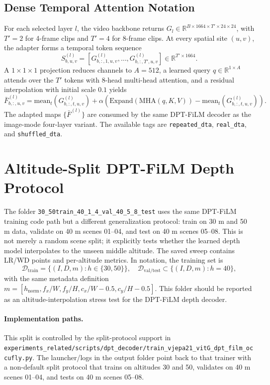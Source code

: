 \documentclass[10pt]{article}
\newcommand{\R}{\mathbb{R}}
\newcommand{\codepath}[1]{\begingroup\small\nolinkurl{#1}\endgroup}
\begin{document}
\subsection{Dense Temporal Attention Notation}
For each selected layer \(l\), the video backbone returns \(G_l\in\R^{B\times1664\times T'\times24\times24}\), with \(T'=2\) for 4-frame clips and \(T'=4\) for 8-frame clips.  At every spatial site \((u,v)\), the adapter forms a temporal token sequence
\[
S_{b,u,v}^{(l)} = [G_{b,:,1,u,v}^{(l)},\ldots,G_{b,:,T',u,v}^{(l)}]\in\R^{T'\times1664}.
\]
A \(1\times1\times1\) projection reduces channels to \(A=512\), a learned query \(q\in\R^{1\times A}\) attends over the \(T'\) tokens with 8-head multi-head attention, and a residual interpolation with initial scale \(0.1\) yields
\[
\bar{F}_{b,:,u,v}^{(l)}
= \mathrm{mean}_t(G_{b,:,t,u,v}^{(l)})+
\alpha\left(\mathrm{Expand}(\mathrm{MHA}(q,K,V))-\mathrm{mean}_t(G_{b,:,t,u,v}^{(l)})\right).
\]
The adapted maps \(\{\bar{F}^{(l)}\}\) are consumed by the same DPT-FiLM decoder as the image-mode four-layer variant.  The available tags are \codepath{repeated_dta}, \codepath{real_dta}, and \codepath{shuffled_dta}.

\section{Altitude-Split DPT-FiLM Depth Protocol}
The folder \codepath{30_50train_40_1_4_val_40_5_8_test} uses the same DPT-FiLM training code path but a different generalization protocol: train on 30 m and 50 m data, validate on 40 m scenes 01--04, and test on 40 m scenes 05--08.  This is not merely a random scene split; it explicitly tests whether the learned depth model interpolates to the unseen middle altitude.  The saved sweep contains LR/WD points and per-altitude metrics.  In notation, the training set is
\[
\mathcal{D}_{\mathrm{train}}=\{(I,D,m): h\in\{30,50\}\},\quad
\mathcal{D}_{\mathrm{val/test}}\subset\{(I,D,m): h=40\},
\]
with the same metadata definition \(m=[h_{\mathrm{norm}}, f_x/W, f_y/H, c_x/W-0.5, c_y/H-0.5]\).  This folder should be reported as an altitude-interpolation stress test for the DPT-FiLM depth decoder.

\paragraph{Implementation paths.}
This split is controlled by the split-protocol support in \codepath{experiments_related/scripts/dpt_decoder/train_vjepa21_vitG_dpt_film_occufly.py}.  The launcher/logs in the output folder point back to that trainer with a non-default split protocol that trains on altitudes 30 and 50, validates on 40 m scenes 01--04, and tests on 40 m scenes 05--08.
\end{document}
